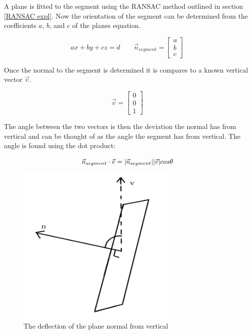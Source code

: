 			A plane is fitted to the segment using the RANSAC method outlined in section \ref{RANSAC expl}. Now the orientation of the segment can be determined from the coefficients $a$, $b$, and $c$ of the planes equation.
			
			\begin{equation}
			ax + by + cz = d  \quad\quad
			\vec{n}_{segment} = \begin{bmatrix}a\\b\\c\end{bmatrix}
			\end{equation}
			
			Once the normal to the segment is determined it is compares to a known vertical vector $\vec{v}$. 
			
			\begin{equation}
			\vec{v} = \begin{bmatrix}0\\0\\1\end{bmatrix}
			\end{equation}
			
			The angle between the two vectors is then the deviation the normal has from vertical and can be thought of as the angle the segment has from vertical. The angle is found using the dot product:
			
			\begin{equation}
			\vec{n}_{segment}\cdot \vec{v} = \lvert \vec{n}_{segment} \rvert \lvert \vec{v} \rvert cos \theta
			\end{equation}
			
			\begin{figure}[H]
				\centering
				\includegraphics[width=0.5\linewidth]{"Includes/images/normal to plane"}
				\caption{The deflection of the plane normal from vertical}
				\label{fig:normaltoplane}
			\end{figure}

